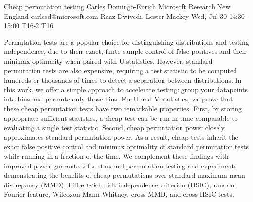 \begin{talk}
  {Cheap permutation testing}%
  {Carles Domingo-Enrich}%
  {Microsoft Research New England}%
  {carlesd@microsoft.com}%
  {Raaz Dwivedi, Lester Mackey}%
  {}%
  {Wed, Jul 30 14:30–15:00}%
  {T16-2}%
  {T16}%
  
				
			
Permutation tests are a popular choice for distinguishing distributions and testing independence, due to their exact, finite-sample control of false positives and their minimax optimality when paired with U-statistics. However, standard permutation tests are also expensive, requiring a test statistic to be computed hundreds or thousands of times to detect a separation between distributions. In this work, we offer a simple approach to accelerate testing: group your datapoints into bins and permute only those bins. For U and V-statistics, we prove that these cheap permutation tests have two remarkable properties. First, by storing appropriate sufficient statistics, a cheap test can be run in time comparable to evaluating a single test statistic. Second, cheap permutation power closely approximates standard permutation power. As a result, cheap tests inherit the exact false positive control and minimax optimality of standard permutation tests while running in a fraction of the time. We complement these findings with improved power guarantees for standard permutation testing and experiments demonstrating the benefits of cheap permutations over standard maximum mean discrepancy (MMD), Hilbert-Schmidt independence criterion (HSIC), random Fourier feature, Wilcoxon-Mann-Whitney, cross-MMD, and cross-HSIC tests.



\end{talk}

